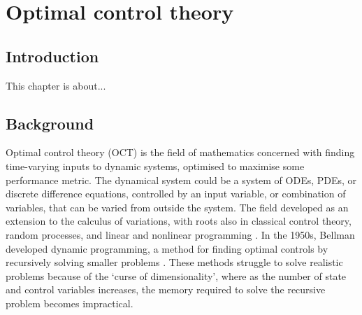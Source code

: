%
\chapter{Optimal control theory}\label{ch:oct}

\section{Introduction}\label{sec:ch2:intro}

This chapter is about...

\section{Background}\label{sec:ch2:background}

Optimal control theory (OCT) is the field of mathematics concerned with finding time-varying inputs to dynamic systems, optimised to maximise some performance metric. The dynamical system could be a system of ODEs, PDEs, or discrete difference equations, controlled by an input variable, or combination of variables, that can be varied from outside the system. The field developed as an extension to the calculus of variations, with roots also in classical control theory, random processes, and linear and nonlinear programming \citep{bryson_optimal_1996}. In the 1950s, Bellman developed dynamic programming, a method for finding optimal controls by recursively solving smaller problems \citep{bellman_dynamic_1957}. These methods struggle to solve realistic problems because of the `curse of dimensionality', where as the number of state and control variables increases, the memory required to solve the recursive problem becomes impractical.

